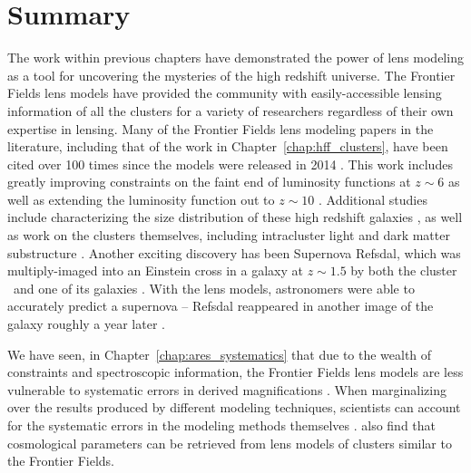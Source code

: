 \section{Summary}

The work within previous chapters have demonstrated the power of lens modeling as a tool for uncovering the mysteries of the high redshift universe. The Frontier Fields lens models have provided the community with easily-accessible lensing information of all the clusters for a variety of researchers regardless of their own expertise in lensing. Many of the Frontier Fields lens modeling papers in the literature, including that of the work in Chapter~\ref{chap:hff_clusters}, have been cited over 100 times since the models were released in 2014 \citep{Johnson:2014tg,Richard:2014gf}. This work includes greatly improving constraints on the faint end of luminosity functions at $z\sim6$ \citep {Bouwens:2017df} as well as extending the luminosity function out to $z\sim10$ \citep{Ishigaki:2017le,Ishigaki:2015cs,McLeod:2016xw}. Additional studies include characterizing the size distribution of these high redshift galaxies \citep{Kawamata:2017bc, Bouwens:2017to,Kawamata:2015ax}, as well as work on the clusters themselves, including intracluster light \citep{Montes:2018hs,Montes:2014jx,Morishita:2017zf} and dark matter substructure \citep{Natarajan:2017qp,Jauzac:2016dn,Mohammed:2016bk,Grillo:2016jk}. Another exciting discovery has been Supernova Refsdal, which was multiply-imaged into an Einstein cross in a galaxy at $z\sim1.5$ by both the cluster \MACSeleven\ and one of its galaxies \citep{Kelly:2016az,Rodney:2016sf,Kelly:2015pj}. With the lens models, astronomers were able to accurately predict a supernova \citep{Treu:2016lr,Jauzac:2016ux,Sharon:2015xe,Oguri:2015hb} -- Refsdal reappeared in another image of the galaxy roughly a year later \citep{Kelly:2016hw}.

We have seen, in Chapter~\ref{chap:ares_systematics} that due to the wealth of constraints and spectroscopic information, the Frontier Fields lens models are less vulnerable to systematic errors in derived magnifications \citep{Johnson:2016rt}. When marginalizing over the results produced by different modeling techniques, scientists can account for the systematic errors in the modeling methods themselves \citep{Meneghetti:2016xe}. \citet{Acebron:2017wl} also find that cosmological parameters can be retrieved from lens models of clusters similar to the Frontier Fields.

